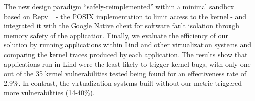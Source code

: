 The new design paradigm ``safely-reimplemented'' within a minimal sandbox based
 on Repy ~\cite{Repy-10} - the POSIX implementation
to limit access to the kernel - and  integrated it with the Google Native client
for software fault isolation through memory safety of the application.
Finally, we evaluate the efficiency of our solution by running applications
within Lind and other virtualization systems
and comparing the kernel traces produced by each application.
The results show that applications run in Lind were the least likely to trigger
kernel bugs,
with only one out of the 35 kernel vulnerabilities tested being found for an
effectiveness rate of 2.9\%.
In contrast, the virtualization systems built without our metric triggered
 more vulnerabilities (14-40\%).


